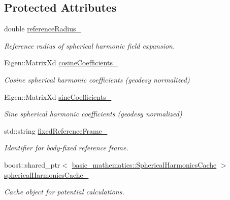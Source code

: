 \subsection*{Protected Attributes}
\begin{DoxyCompactItemize}
\item 
double \hyperlink{classtudat_1_1gravitation_1_1SphericalHarmonicsGravityField_a30a2d290373ba058f6b908e0c006997e}{reference\+Radius\+\_\+}
\begin{DoxyCompactList}\small\item\em Reference radius of spherical harmonic field expansion. \end{DoxyCompactList}\item 
Eigen\+::\+Matrix\+Xd \hyperlink{classtudat_1_1gravitation_1_1SphericalHarmonicsGravityField_a976097b5feae44132eb1867c0b538869}{cosine\+Coefficients\+\_\+}
\begin{DoxyCompactList}\small\item\em Cosine spherical harmonic coefficients (geodesy normalized) \end{DoxyCompactList}\item 
Eigen\+::\+Matrix\+Xd \hyperlink{classtudat_1_1gravitation_1_1SphericalHarmonicsGravityField_accb57f8fd5997a24737fbadf9341e3b0}{sine\+Coefficients\+\_\+}
\begin{DoxyCompactList}\small\item\em Sine spherical harmonic coefficients (geodesy normalized) \end{DoxyCompactList}\item 
std\+::string \hyperlink{classtudat_1_1gravitation_1_1SphericalHarmonicsGravityField_a5524e491cd850068d2ea055635a5d301}{fixed\+Reference\+Frame\+\_\+}
\begin{DoxyCompactList}\small\item\em Identifier for body-\/fixed reference frame. \end{DoxyCompactList}\item 
boost\+::shared\+\_\+ptr$<$ \hyperlink{classtudat_1_1basic__mathematics_1_1SphericalHarmonicsCache}{basic\+\_\+mathematics\+::\+Spherical\+Harmonics\+Cache} $>$ \hyperlink{classtudat_1_1gravitation_1_1SphericalHarmonicsGravityField_afcceac487c215a8ad7efd0b712fca49f}{spherical\+Harmonics\+Cache\+\_\+}\hypertarget{classtudat_1_1gravitation_1_1SphericalHarmonicsGravityField_afcceac487c215a8ad7efd0b712fca49f}{}\label{classtudat_1_1gravitation_1_1SphericalHarmonicsGravityField_afcceac487c215a8ad7efd0b712fca49f}

\begin{DoxyCompactList}\small\item\em Cache object for potential calculations. \end{DoxyCompactList}\end{DoxyCompactItemize}


